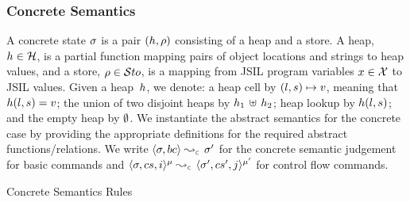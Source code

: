 \subsubsection{Concrete Semantics}
A \jsil concrete state $\sigma$ is a pair $(h, \rho)$ consisting of a heap and a store. 
A heap, $h \in {\mathcal H}$, is a partial function mapping pairs of  object locations  and strings to heap values, 
and a store, $\rho \in \mathcal{S}to$, is a mapping from JSIL program variables $x \in \mathcal{X}$ to JSIL values. 
Given a heap~$h$, we denote: a heap cell by $(l, s) \mapsto v$, 
meaning that  $h(l,s) = v$; the union of two disjoint heaps by $h_1 \, \uplus \, h_2$; 
heap lookup by $h(l, s)$; and the empty heap by $\emptyset$.
We instantiate the abstract semantics for the concrete case by providing the appropriate definitions 
for the required abstract functions/relations. 
We write $\absbsemrule{\jstate, \bcmd}{\jstate'}{\concrete}$ for the concrete semantic 
judgement for basic commands and $\abssemrule{\jstate, \cs, i}{\jstate', \cs', j}{\mode}{\mode'}{\concrete}$ 
for control flow commands. 

\begin{display}{Concrete Semantics Rules}
 \end{display}
  

